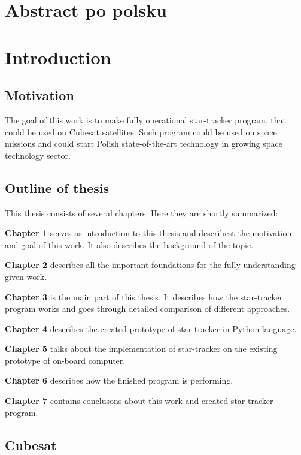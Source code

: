 \documentclass[12pt,a4paper,oneside]{article}
\begin{document}
\section{Abstract po polsku}

\section{Introduction}
\subsection{Motivation}
The goal of this work is to make fully operational star-tracker program, that could be used on Cubesat satellites. Such program could be used on space missions and could start Polish state-of-the-art technology in growing space technology sector.

\subsection{Outline of thesis}



This thesis consists of several chapters. Here they are shortly summarized:\par
\setlength{\parindent}{0cm}
\textbf{Chapter 1} serves as introduction to this thesis and describest the motivation and goal of this work. It also describes the background of the topic.\par
\textbf{Chapter 2} describes all the important foundations for the fully understanding given work.\par
\textbf{Chapter 3} is the main part of this thesis. It describes how the star-tracker program works and goes through detailed comparison of different approaches.\par
\textbf{Chapter 4} describes the created prototype of star-tracker in Python language.\par
\textbf{Chapter 5} talks about the implementation of star-tracker on the existing prototype of on-board computer.\par
\textbf{Chapter 6} describes how the finished program is performing.\par
\textbf{Chapter 7} contains conclusons about this work and created star-tracker program.\par

\setlength{\parindent}{1cm}

\subsection{Cubesat}
\end{document}
